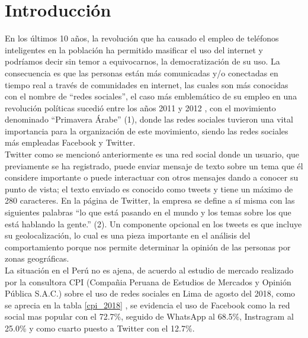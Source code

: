 \chapter{Introducci\'on}

En los últimos 10 años, la revolución que ha causado el empleo de teléfonos inteligentes en la población 
ha permitido masificar el uso del internet y podríamos decir sin temor a equivocarnos, la democratización de su uso.
 La consecuencia es que las personas están más comunicadas y/o conectadas en tiempo real a través  de comunidades 
 en internet, las cuales son más conocidas con el nombre de “redes sociales”, el caso más emblemático de su empleo 
 en una revolución políticas sucedió entre los años 2011 y 2012 , con el movimiento denominado  “Primavera Árabe” (1), 
 donde las redes sociales tuvieron una vital importancia para la organización de este movimiento, siendo las redes 
 sociales más empleadas Facebook y Twitter. \\
      
Twitter como se mencionó anteriormente es una red social donde un usuario, que previamente se ha registrado, 
puede enviar mensaje de texto sobre un tema que él considere importante o puede interactuar con otros mensajes 
dando a conocer su punto de vista; el texto enviado es conocido como tweets y tiene un máximo de 280 caracteres. 
En la página de Twitter, la empresa se define a sí misma con las siguientes palabras “lo que está pasando en el 
mundo y los temas sobre los que está hablando la gente.” (2). Un componente opcional en los tweets es que incluye 
su geolocalización, lo cual es una pieza importante en el análisis del comportamiento porque nos permite determinar 
la opinión de las personas por zonas geográficas. \\

La situaci\'on en el Per\'u no es ajena, de acuerdo al estudio de mercado realizado por la consultora CPI (Compa\~nia Peruana de Estudios de Mercados y Opini\'on P\'ublica S.A.C.) sobre el uso de redes sociales en Lima de agosto del 2018, como se aprecia en la tabla \ref{cpi_2018} , se evidencia el uso de Facebook como la red social mas popular con el 72.7\%, seguido de WhatsApp al 68.5\%, Instragram al 25.0\% y como cuarto puesto a Twitter con el 12.7\%. \\


